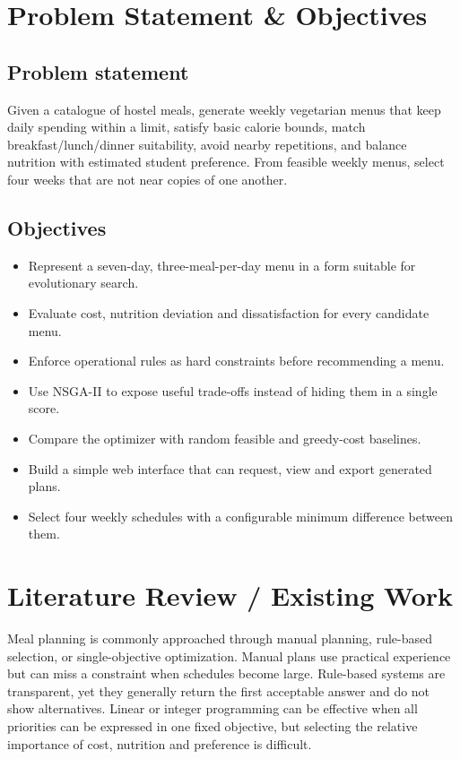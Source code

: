 \documentclass[12pt,a4paper]{report}
\begin{document}
\chapter{Problem Statement \& Objectives}
\section{Problem statement}
Given a catalogue of hostel meals, generate weekly vegetarian menus that keep daily spending within a limit, satisfy basic calorie bounds, match breakfast/lunch/dinner suitability, avoid nearby repetitions, and balance nutrition with estimated student preference. From feasible weekly menus, select four weeks that are not near copies of one another.

\section{Objectives}
\begin{itemize}
\item Represent a seven-day, three-meal-per-day menu in a form suitable for evolutionary search.
\item Evaluate cost, nutrition deviation and dissatisfaction for every candidate menu.
\item Enforce operational rules as hard constraints before recommending a menu.
\item Use NSGA-II to expose useful trade-offs instead of hiding them in a single score.
\item Compare the optimizer with random feasible and greedy-cost baselines.
\item Build a simple web interface that can request, view and export generated plans.
\item Select four weekly schedules with a configurable minimum difference between them.
\end{itemize}

\chapter{Literature Review / Existing Work}
Meal planning is commonly approached through manual planning, rule-based selection, or single-objective optimization. Manual plans use practical experience but can miss a constraint when schedules become large. Rule-based systems are transparent, yet they generally return the first acceptable answer and do not show alternatives. Linear or integer programming can be effective when all priorities can be expressed in one fixed objective, but selecting the relative importance of cost, nutrition and preference is difficult.
\end{document}

